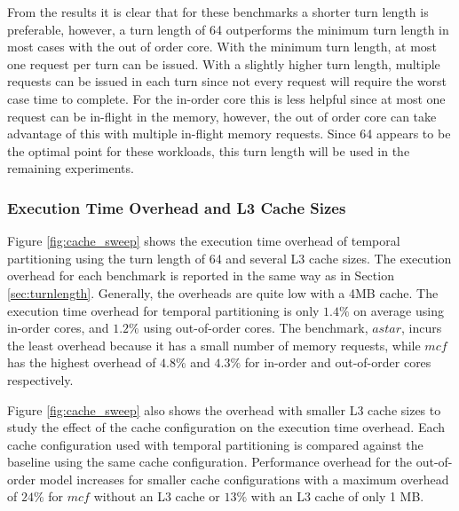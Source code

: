 From the results it is clear that for these benchmarks a shorter turn length 
is preferable, however, a turn length of 64 outperforms the minimum turn length 
in most cases with the out of order core. With the minimum turn length, at most one request per turn can 
be issued. With a slightly higher turn length, multiple requests can be issued 
in each turn since not every request will require the worst case 
time to complete. For the in-order core this is less helpful since at most one 
request can be in-flight in the memory, however, the out of order core can take 
advantage of this with multiple in-flight memory requests. Since 64 appears to 
be the optimal point for these workloads, this turn length will be used in the 
remaining experiments.

\subsubsection{Execution Time Overhead and L3 Cache Sizes}

Figure \ref{fig:cache_sweep} shows the execution time overhead of temporal 
partitioning using the turn length of 64 and several L3 cache sizes. 
The execution overhead for each benchmark is reported in the same way as in Section
\ref{sec:turnlength}. Generally, the overheads are quite low with a 4MB 
cache. The execution time overhead for temporal partitioning is only $1.4\%$ on 
average using in-order cores, and $1.2\%$ using out-of-order cores. The 
benchmark, $astar$, incurs the least overhead because it has a small number of memory requests, 
while $mcf$ has the highest overhead of $4.8\%$ and $4.3\%$ for in-order and 
out-of-order cores respectively.

\begin{figure*}
    \begin{center}
        \vspace{-0.10in}
        \caption{Execution Time Overhead and the Effect of Cache Configuration.}
        \label{fig:cache_sweep}
    \end{center}
\end{figure*}

Figure \ref{fig:cache_sweep} also shows the overhead with smaller 
L3 cache sizes to study the effect of the cache configuration on the execution 
time overhead. Each cache configuration used with temporal partitioning is 
compared against the baseline using the same cache configuration. Performance 
overhead for the out-of-order model increases for smaller cache configurations with a maximum overhead of $24\%$ for $mcf$ without an L3 cache or $13\%$ with an L3 cache of only 1 MB.



